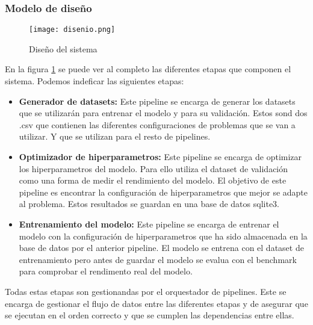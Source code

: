 \subsubsection{Modelo de diseño}
\begin{figure}[ht]
    \centering
    \texttt{[image: disenio.png]}
    \caption{Diseño del sistema}
    \label{fig:desing}
\end{figure}

En la figura \ref{fig:desing} se puede ver al completo las diferentes etapas que componen
el sistema. Podemos indeficar las siguientes etapas:
\begin{itemize}
    \item \textbf{Generador de datasets: } Este pipeline se encarga de generar los datasets
    que se utilizarán para entrenar el modelo y para su validación. Estos sond dos .csv que
    contienen las diferentes configuraciones de problemas que se van a utilizar. Y que se
    utilizan para el resto de pipelines.
    \item \textbf{Optimizador de hiperparametros: } Este pipeline se encarga de optimizar
    los hiperparametros del modelo. Para ello utiliza el dataset de validación como una
    forma de medir el rendimiento del modelo. El objetivo de este pipeline es encontrar
    la configuración de hiperparametros que mejor se adapte al problema. Estos resultados
    se guardan en una base de datos sqlite3.
    \item \textbf{Entrenamiento del modelo: } Este pipeline se encarga de entrenar el modelo
    con la configuración de hiperparametros que ha sido almacenada en la base de datos por el
    anterior pipeline. El modelo se entrena con el dataset de entrenamiento pero antes de
    guardar el modelo se evalua con el benchmark para comprobar el rendimento real del modelo.
\end{itemize} 

Todas estas etapas son gestionandas por el orquestador de pipelines. Este se encarga de
gestionar el flujo de datos entre las diferentes etapas y de asegurar que se ejecutan en
el orden correcto y que se cumplen las dependencias entre ellas.